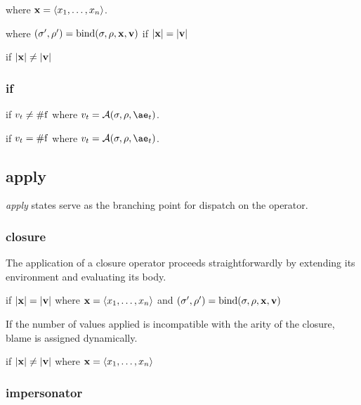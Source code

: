 \documentclass{sigplanconf}
\begin{document}
\noindent
{}

\noindent
where $\mathbf{x}=\langle x_1,\dots,x_n\rangle$.


\noindent
where $(\sigma',\rho')=\mathrm{bind}(\sigma,\rho,\mathbf{x},\mathbf{v})$ if $|\mathbf{x}|=|\mathbf{v}|$

 if $|\mathbf{x}|\ne|\mathbf{v}|$

\subsubsection{if}

if $v_t\ne\mathrm{\#f}$
where $v_t=\A{\sigma}{\rho}{\ae_t}$.

if $v_t=\mathrm{\#f}$
where $v_t=\A{\sigma}{\rho}{\ae_t}$.

\subsection{apply}

\emph{apply} states serve as the branching point for dispatch on the operator.

\subsubsection{closure}

The application of a closure operator proceeds straightforwardly by extending its environment and evaluating its body.

if $|\mathbf{x}|=|\mathbf{v}|$ where $\mathbf{x}=\langle x_1,\dots,x_n\rangle$ and $(\sigma',\rho')=\mathrm{bind}(\sigma,\rho,\mathbf{x},\mathbf{v})$

If the number of values applied is incompatible with the arity of the closure, blame is assigned dynamically.

if $|\mathbf{x}|\ne|\mathbf{v}|$ where $\mathbf{x}=\langle x_1,\dots,x_n\rangle$

\subsubsection{impersonator}
\end{document}
